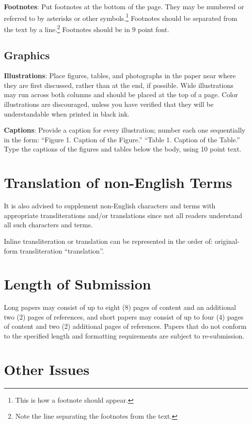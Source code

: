 \documentclass[11pt]{article}
\begin{document}
{\bf Footnotes}: Put footnotes at the bottom of the page. They may
be numbered or referred to by asterisks or other
symbols.\footnote{This is how a footnote should appear.} Footnotes
should be separated from the text by a line.\footnote{Note the
line separating the footnotes from the text.}  Footnotes should be in 9 point font.

\subsection{Graphics}

{\bf Illustrations}: Place figures, tables, and photographs in the
paper near where they are first discussed, rather than at the end, if
possible.  Wide illustrations may run across both columns and should be placed at
the top of a page. Color illustrations are discouraged, unless you have verified that
they will be understandable when printed in black ink.

{\bf Captions}: Provide a caption for every illustration; number each one
sequentially in the form:  ``Figure 1. Caption of the Figure.'' ``Table 1.
Caption of the Table.''  Type the captions of the figures and
tables below the body, using 10 point text.

\section{Translation of non-English Terms}

It is also advised to supplement non-English characters and terms
with appropriate transliterations and/or translations
since not all readers understand all such characters and terms.

Inline transliteration or translation can be represented in
the order of: original-form transliteration ``translation''.

\section{Length of Submission}
\label{sec:length}

Long papers may consist of up to eight (8) pages of content and an
additional two (2) pages of references, and short papers may consist
of up to four (4) pages of content and two (2) additional pages of
references.  Papers that do not conform to the specified length and
formatting requirements are subject to re-submission.

\section{Other Issues}
 
\end{document}
